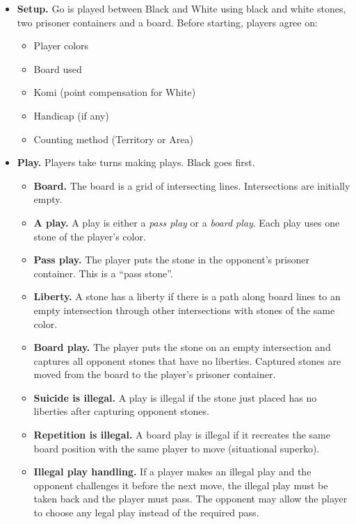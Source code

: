 \documentclass[11pt]{article}
\begin{document}
\begin{itemize}
\item \textbf{Setup.} Go is played between Black and White using black and white stones, two prisoner containers and a board.
Before starting, players agree on:
    \begin{itemize}
    \item Player colors
    \item Board used
    \item Komi (point compensation for White)
    \item Handicap (if any)
    \item Counting method (Territory or Area)
    \end{itemize}

\item \textbf{Play.} Players take turns making plays.
Black goes first.
    \begin{itemize}
    \item \textbf{Board.} The board is a grid of intersecting lines.
    Intersections are initially empty.
    \item \textbf{A play.} A play is either a \textit{pass play} or a \textit{board play}.
    Each play uses one stone of the player's color.
    \item \textbf{Pass play.} The player puts the stone in the opponent's prisoner container.
    This is a ``pass stone''.
    \item \textbf{Liberty.} A stone has a liberty if there is a path along board lines to an empty intersection through other intersections with stones of the same color.
    \item \textbf{Board play.} The player puts the stone on an empty intersection and captures all opponent stones that have no liberties.
    Captured stones are moved from the board to the player's prisoner container.
    \item \textbf{Suicide is illegal.} A play is illegal if the stone just placed has no liberties after capturing opponent stones.
    \item \textbf{Repetition is illegal.} A board play is illegal if it recreates the same board position with the same player to move (situational superko).
    \item \textbf{Illegal play handling.} If a player makes an illegal play and the opponent challenges it before the next move, the illegal play must be taken back and the player must pass.
    The opponent may allow the player to choose any legal play instead of the required pass.
    \end{itemize}


\end{itemize}
\end{document}
